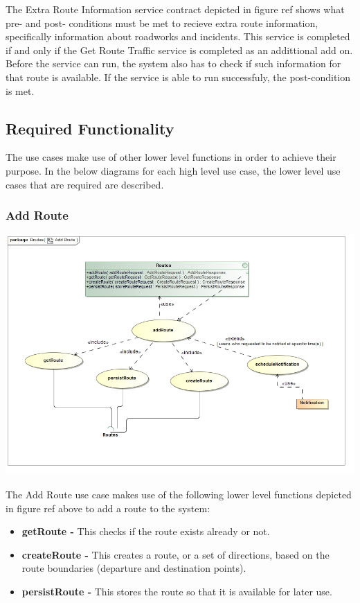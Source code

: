 \documentclass[a4paper,12pt]{article}
\begin{document}
The Extra Route Information service contract depicted in {figure ref} shows what pre- and post- conditions must be met to recieve extra route information, specifically information about roadworks and incidents. This service is completed if and only if the Get Route Traffic service is completed as an addittional add on. Before the service can run, the system also has to check if such information for that route is available. If the service is able to run successfuly, the post-condition is met.

\subsection{Required Functionality}
The use cases make use of other lower level functions in order to achieve their purpose. In the below diagrams for each high level use case, the lower level use cases that are required are described.

\subsubsection{Add Route}
\includegraphics[width=\textwidth]{images/Add_Route.jpg}

The Add Route use case makes use of the following lower level functions depicted in {figure ref} above to add a route to the system:
\begin{itemize}
\item \textbf{getRoute -} This checks if the route exists already or not.
\item \textbf{createRoute -} This creates a route, or a set of directions, based on the route boundaries (departure and destination points).
\item \textbf{persistRoute -} This stores the route so that it is available for later use.
\end{itemize}
\end{document}
